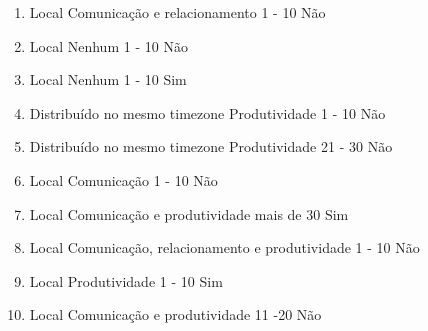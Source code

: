 \begin{enumerate}
	\item
	\begin{respostas1}
		{Local}
		{Comunicação e relacionamento}
		{1 - 10}
		{Não}
	\end{respostas1}

	\item
	\begin{respostas1}
		{Local}
		{Nenhum}
		{1 - 10}
		{Não}
	\end{respostas1}

	\item
	\begin{respostas1}
		{Local}
		{Nenhum}
		{1 - 10}
		{Sim}
	\end{respostas1}

	\item
	\begin{respostas1}
		{Distribuído no mesmo timezone}
		{Produtividade}
		{1 - 10}
		{Não}
	\end{respostas1}

	\item
	\begin{respostas1}
		{Distribuído no mesmo timezone}
		{Produtividade}
		{21 - 30}
		{Não}
	\end{respostas1}

	\item
	\begin{respostas1}
		{Local}
		{Comunicação}
		{1 - 10}
		{Não}
	\end{respostas1}

	\item
	\begin{respostas1}
		{Local}
		{Comunicação e produtividade}
		{mais de 30}
		{Sim}
	\end{respostas1}

	\item
	\begin{respostas1}
		{Local}
		{Comunicação, relacionamento e produtividade}
		{1 - 10}
		{Não}
	\end{respostas1}

	\item
	\begin{respostas1}
		{Local}
		{Produtividade}
		{1 - 10}
		{Sim}
	\end{respostas1}

	\item
	\begin{respostas1}
		{Local}
		{Comunicação e produtividade}
		{11 -20}
		{Não}
	\end{respostas1}


\end{enumerate}
